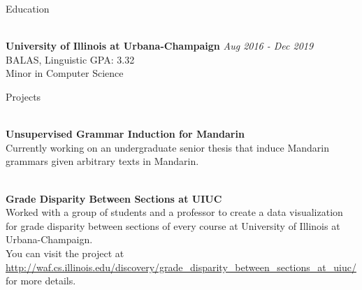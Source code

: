 \documentclass{resume}
\begin{document}
\begin{rSection}{Education}


\\{\bf University of Illinois at Urbana-Champaign} \hfill {\em Aug 2016 - Dec 2019} 
\\ BALAS, Linguistic\hfill { GPA: 3.32 } \\
Minor in Computer Science \smallskip \\

\end{rSection}

\begin{rSection}{Projects}

\\{\bf Unsupervised Grammar Induction for Mandarin}\\
Currently working on an undergraduate senior thesis that induce Mandarin grammars given arbitrary texts in Mandarin.

\\{\bf Grade Disparity Between Sections at UIUC}\\
Worked with a group of students and a professor to create a data visualization for grade disparity between sections of every course at University of Illinois at Urbana-Champaign.\\
You can visit the project at \url{http://waf.cs.illinois.edu/discovery/grade_disparity_between_sections_at_uiuc/} for more details.

\end{rSection}
\end{document}
